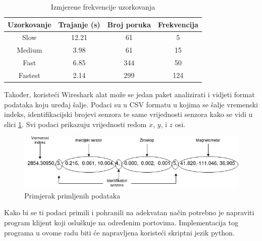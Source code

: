 \documentclass[times, utf8, diplomski]{fer}
\begin{document}
\begin{table} [h!]
 \centering
    \begin{tabular}{|c|c|c|c|}
        \hline
        Uzorkovanje & Trajanje (s) & Broj poruka & Frekvencija \\
        \hline
        Slow & 12.21 & 61 & 5 \\
        Medium & 3.98 & 61 & 15 \\
        Fast & 6.85 & 344 & 50 \\
        Fastest & 2.14 & 299 & 124\\
        \hline
    \end{tabular}
    \caption{Izmjerene frekvencije uzorkovanja}
    \label{frekvencije}
\end{table}

Također, koristeći Wireshark alat može se jedan paket analizirati i vidjeti format podataka koju uređaj šalje. Podaci su u CSV formatu u kojima se šalje vremenski indeks,
identifikacijski brojevi senzora te same vrijednosti senzora kako se vidi u slici \ref{datagram}. Svi podaci prikazuju vrijednosti redom $x$, $y$, i $z$ osi.

\begin{figure}[h]
    \includegraphics[width=\textwidth]{datagram.png}
    \caption{Primjerak primljenih podataka}
    \label{datagram}
\end{figure}

Kako bi se ti podaci primili i pohranili na adekvatan način potrebno je napraviti program klijent koji osluškuje na određenim portovima. Implementacija tog programa 
u ovome radu biti će napravljena koristeći skriptni jezik python. 
\end{document}
